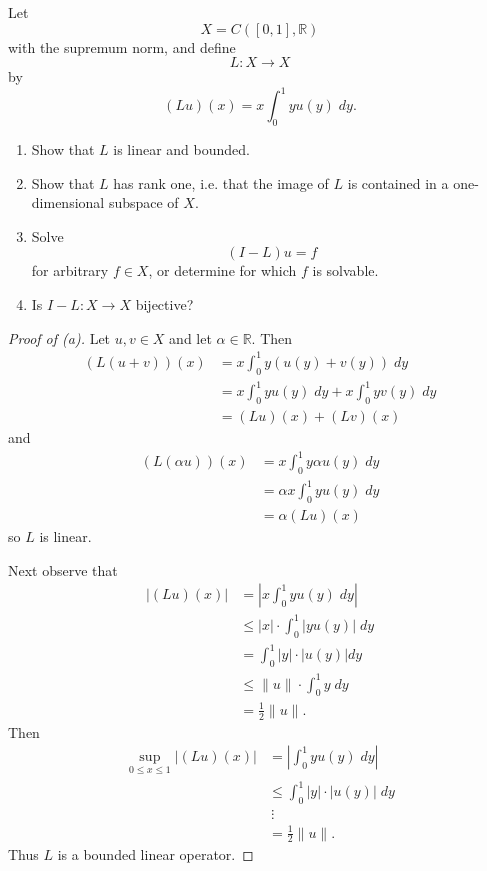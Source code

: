\begin{prob}
    Let 
    \[
        X = C([0,1], \mathbb R)
    \]
    with the supremum norm, and define 
    \[
        L : X \to X
    \]
    by 
    \[
        (Lu)(x) = 
        x\int_0^1 yu(y) \;dy.
    \]

    \begin{enumerate}[label=\alph*)]
        \item Show that $L$ is linear 
            and bounded.
        \item Show that $L$ has rank one, i.e. 
            that the image of $L$ is contained 
            in a one-dimensional subspace of $X$.
        \item Solve 
            \[
                (I-L)u = f
            \]
            for arbitrary $f \in X$, or determine for 
            which $f$ is solvable.
        \item Is $I-L : X \to X$ bijective?
    \end{enumerate}
\end{prob}
\begin{proof}[Proof of (a)]
    Let $u,v \in X$ and let $\alpha \in \mathbb R$.
    Then 
    \begin{align*}
        (L(u+v))(x) 
        &= x\int_0^1 y(u(y) + v(y)) \;dy \\ 
        &= x\int_0^1 yu(y) \;dy + x\int_0^1 yv(y) \;dy \\ 
        &= (Lu)(x) + (Lv)(x)
    \end{align*}
    and 
    \begin{align*}
        (L(\alpha u))(x) 
        &= x\int_0^1 y\alpha u(y) \; dy \\ 
        &= \alpha x \int_0^1 y u(y) \; dy
        \\ 
        &= \alpha (Lu)(x)
    \end{align*}
    so $L$ is linear. 
    
    Next observe that 
    \begin{align*}
        |(Lu)(x)| 
        &= \left|x \int_0^1 y u(y) \; dy \right| \\ 
        &\leq |x| \cdot \int_0^1 \left|y u(y) \right| \; dy \\ 
        &= \int_0^1 \left|y\right| \cdot \left|u(y)\right| dy \\ 
        &\leq \|u\| \cdot \int_0^1 y \; dy \\ 
        &= \frac{1}{2} \|u\|.
    \end{align*}
    Then 
    \begin{align*}
        \sup_{0 \leq x \leq 1} |(Lu)(x)| 
        &= \left|\int_0^1 y u(y) \;dy\right| \\ 
        &\leq \int_0^1 |y| \cdot |u(y)| \; dy \\ 
        & \: \vdots \\ 
        &= \frac{1}{2}\|u\|. 
    \end{align*}
    Thus $L$ is a bounded linear operator. 
\end{proof}
